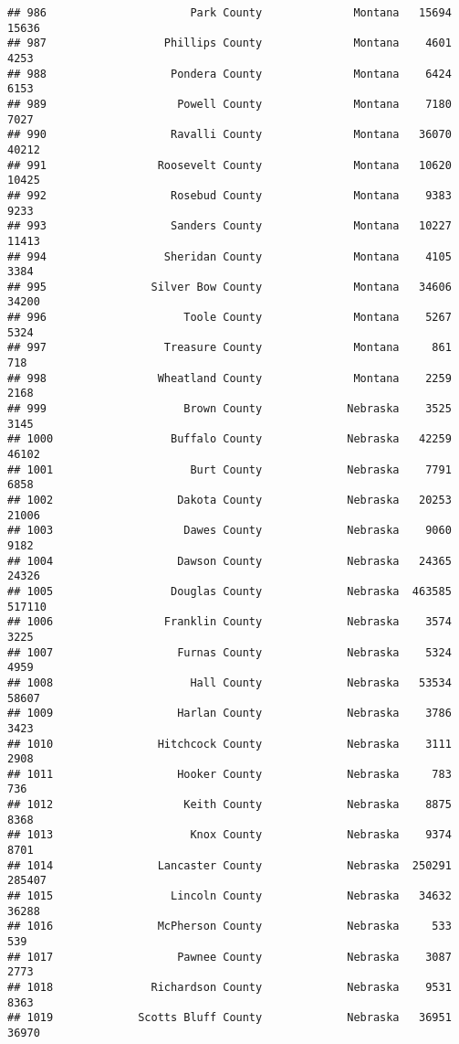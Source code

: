 \documentclass[
]{article}
\begin{document}
\begin{verbatim}
## 986                      Park County              Montana   15694   15636
## 987                  Phillips County              Montana    4601    4253
## 988                   Pondera County              Montana    6424    6153
## 989                    Powell County              Montana    7180    7027
## 990                   Ravalli County              Montana   36070   40212
## 991                 Roosevelt County              Montana   10620   10425
## 992                   Rosebud County              Montana    9383    9233
## 993                   Sanders County              Montana   10227   11413
## 994                  Sheridan County              Montana    4105    3384
## 995                Silver Bow County              Montana   34606   34200
## 996                     Toole County              Montana    5267    5324
## 997                  Treasure County              Montana     861     718
## 998                 Wheatland County              Montana    2259    2168
## 999                     Brown County             Nebraska    3525    3145
## 1000                  Buffalo County             Nebraska   42259   46102
## 1001                     Burt County             Nebraska    7791    6858
## 1002                   Dakota County             Nebraska   20253   21006
## 1003                    Dawes County             Nebraska    9060    9182
## 1004                   Dawson County             Nebraska   24365   24326
## 1005                  Douglas County             Nebraska  463585  517110
## 1006                 Franklin County             Nebraska    3574    3225
## 1007                   Furnas County             Nebraska    5324    4959
## 1008                     Hall County             Nebraska   53534   58607
## 1009                   Harlan County             Nebraska    3786    3423
## 1010                Hitchcock County             Nebraska    3111    2908
## 1011                   Hooker County             Nebraska     783     736
## 1012                    Keith County             Nebraska    8875    8368
## 1013                     Knox County             Nebraska    9374    8701
## 1014                Lancaster County             Nebraska  250291  285407
## 1015                  Lincoln County             Nebraska   34632   36288
## 1016                McPherson County             Nebraska     533     539
## 1017                   Pawnee County             Nebraska    3087    2773
## 1018               Richardson County             Nebraska    9531    8363
## 1019             Scotts Bluff County             Nebraska   36951   36970

\end{verbatim}
\end{document}
